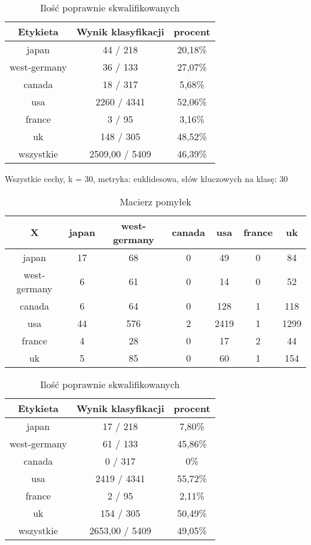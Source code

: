 \documentclass{classrep}
\begin{document}
\begin{table}[h]
\centering
\begin{tabular}{|c|c|c|}
\hline
Etykieta & Wynik klasyfikacji & procent\\
\hline
japan & 44 / 218 & 20,18\%\\
\hline
west-germany & 36 / 133 & 27,07\%\\
\hline
canada & 18 / 317 & 5,68\%\\
\hline
usa & 2260 / 4341 & 52,06\%\\
\hline
france & 3 / 95 & 3,16\%\\
\hline
uk & 148 / 305 & 48,52\%\\
\hline
wszystkie & 2509,00 / 5409 & 46,39\%\\
\hline
\end{tabular}
\caption{Ilość poprawnie skwalifikowanych}\end{table}



\newpage
Wszystkie cechy, k = 30, metryka: euklidesowa, słów kluczowych na klasę: 30\newline
\begin{table}[h]
\centering
\begin{tabular}{|c|c|c|c|c|c|c|}
\hline
 X  & japan & west-germany & canada & usa & france & uk\\
\hline
japan & 17 & 68 & 0 & 49 & 0 & 84\\
\hline
west-germany & 6 & 61 & 0 & 14 & 0 & 52\\
\hline
canada & 6 & 64 & 0 & 128 & 1 & 118\\
\hline
usa & 44 & 576 & 2 & 2419 & 1 & 1299\\
\hline
france & 4 & 28 & 0 & 17 & 2 & 44\\
\hline
uk & 5 & 85 & 0 & 60 & 1 & 154\\
\hline
\end{tabular}
\caption{Macierz pomyłek}\end{table}

\begin{table}[h]
\centering
\begin{tabular}{|c|c|c|}
\hline
Etykieta & Wynik klasyfikacji & procent\\
\hline
japan & 17 / 218 & 7,80\%\\
\hline
west-germany & 61 / 133 & 45,86\%\\
\hline
canada & 0 / 317 & 0\%\\
\hline
usa & 2419 / 4341 & 55,72\%\\
\hline
france & 2 / 95 & 2,11\%\\
\hline
uk & 154 / 305 & 50,49\%\\
\hline
wszystkie & 2653,00 / 5409 & 49,05\%\\
\hline
\end{tabular}
\caption{Ilość poprawnie skwalifikowanych}\end{table}
\end{document}

